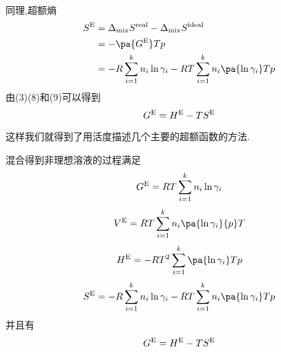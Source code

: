 \documentclass{ctexart}
\begin{document}
\begin{derivation}
\begin{equation}
\begin{aligned}
        \end{aligned}
    \end{equation}
    同理,超额熵
    \begin{equation}
        \begin{aligned}
            S^{\text E}
            &= \Delta_{\text{mix}}S^{\text{real}}-\Delta_{\text{mix}}S^{\text{ideal}} \\
            &= -\pa{G^\text E}Tp \\
            &= -R\sum_{i=1}^{k}n_i\ln\gamma_i-RT\sum_{i=1}^{k}n_i\pa{\ln\gamma_i}Tp
        \end{aligned}
    \end{equation}
    由(3)(8)和(9)可以得到
    \[G^\text E=H^\text E-TS^\text E\]
    
\end{derivation}
这样我们就得到了用活度描述几个主要的超额函数的方法.
\begin{theorem}[4C.5.5 混合得到非理想溶液的热力学函数变化]
    混合得到非理想溶液的过程满足
    \[G^\text E=RT\sum_{i=1}^{k}n_i\ln\gamma_i\]
    \[V^\text E=RT\sum_{i=1}^{k}n_i\pa{\ln\gamma_i}{p}T\]
    \[H^\text E=-RT^2\sum_{i=1}^{k}\pa{\ln\gamma_i}Tp\]
    \[S^\text E=-R\sum_{i=1}^{k}n_i\ln\gamma_i-RT\sum_{i=1}^{k}n_i\pa{\ln\gamma_i}Tp\]
    并且有
    \[G^\text E=H^\text E-TS^\text E\]

\end{theorem}
\end{document}

